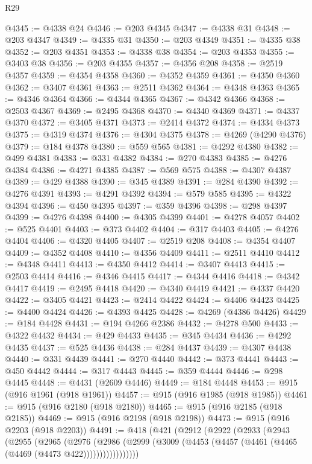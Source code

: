 \begin{lexlean}{R29}
\begin{coremodule}
@4345 := @4338 @24
@4346 := @203 @4345
@4347 := @4338 @31
@4348 := @203 @4347
@4349 := @4335 @31
@4350 := @203 @4349
@4351 := @4335 @38
@4352 := @203 @4351
@4353 := @4338 @38
@4354 := @203 @4353
@4355 := @3403 @38
@4356 := @203 @4355
@4357 := @4356 @208
@4358 := @2519 @4357
@4359 := @4354 @4358
@4360 := @4352 @4359
@4361 := @4350 @4360
@4362 := @3407 @4361
@4363 := @2511 @4362
@4364 := @4348 @4363
@4365 := @4346 @4364
@4366 := @4344 @4365
@4367 := @4342 @4366
@4368 := @2503 @4367
@4369 := @2495 @4368
@4370 := @4340 @4369
@4371 := @4337 @4370
@4372 := @3405 @4371
@4373 := @2414 @4372
@4374 := @4334 @4373
@4375 := @4319 @4374
@4376 := @4304 @4375
@4378 := @4269 (@4290 @4376)
@4379 := @184 @4378
@4380 := @559 @565
@4381 := @4292 @4380
@4382 := @499 @4381
@4383 := @331 @4382
@4384 := @270 @4383
@4385 := @4276 @4384
@4386 := @4271 @4385
@4387 := @569 @575
@4388 := @4307 @4387
@4389 := @429 @4388
@4390 := @345 @4389
@4391 := @284 @4390
@4392 := @4276 @4391
@4393 := @4291 @4392
@4394 := @579 @585
@4395 := @4322 @4394
@4396 := @450 @4395
@4397 := @359 @4396
@4398 := @298 @4397
@4399 := @4276 @4398
@4400 := @4305 @4399
@4401 := @4278 @4057
@4402 := @525 @4401
@4403 := @373 @4402
@4404 := @317 @4403
@4405 := @4276 @4404
@4406 := @4320 @4405
@4407 := @2519 @208
@4408 := @4354 @4407
@4409 := @4352 @4408
@4410 := @4356 @4409
@4411 := @2511 @4410
@4412 := @4348 @4411
@4413 := @4350 @4412
@4414 := @3407 @4413
@4415 := @2503 @4414
@4416 := @4346 @4415
@4417 := @4344 @4416
@4418 := @4342 @4417
@4419 := @2495 @4418
@4420 := @4340 @4419
@4421 := @4337 @4420
@4422 := @3405 @4421
@4423 := @2414 @4422
@4424 := @4406 @4423
@4425 := @4400 @4424
@4426 := @4393 @4425
@4428 := @4269 (@4386 @4426)
@4429 := @184 @4428
@4431 := @194 @4266 @2386
@4432 := @4278 @500
@4433 := @4322 @4432
@4434 := @429 @4433
@4435 := @345 @4434
@4436 := @4292 @4435
@4437 := @525 @4436
@4438 := @284 @4437
@4439 := @4307 @4438
@4440 := @331 @4439
@4441 := @270 @4440
@4442 := @373 @4441
@4443 := @450 @4442
@4444 := @317 @4443
@4445 := @359 @4444
@4446 := @298 @4445
@4448 := @4431 (@2609 @4446)
@4449 := @184 @4448
@4453 := @915 (@916 @1961 (@918 @1961))
@4457 := @915 (@916 @1985 (@918 @1985))
@4461 := @915 (@916 @2180 (@918 @2180))
@4465 := @915 (@916 @2185 (@918 @2185))
@4469 := @915 (@916 @2198 (@918 @2198))
@4473 := @915 (@916 @2203 (@918 @2203))
@4491 := @418
    (@421
      (@2912
        (@2922
          (@2933
            (@2943
              (@2955
                (@2965
                  (@2976
                    (@2986
                      (@2999 (@3009 (@4453 (@4457 (@4461 (@4465 (@4469 (@4473 @422)))))))))))))))))

\end{coremodule}
\end{lexlean}

